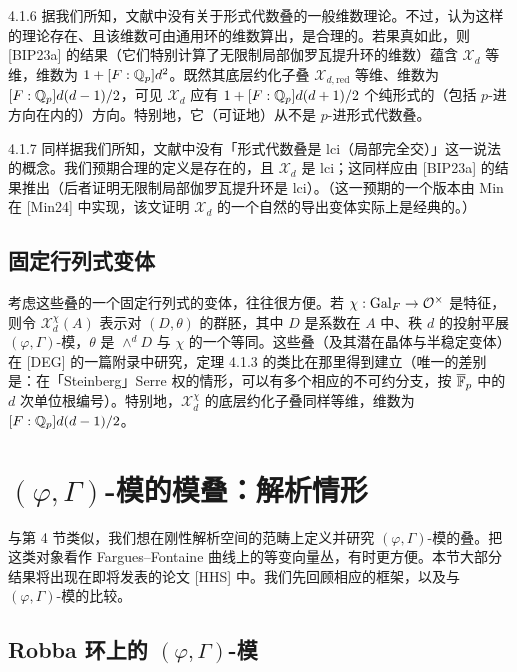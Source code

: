 \begin{rem}{4.1.6}
据我们所知，文献中没有关于形式代数叠的一般维数理论。不过，认为这样的理论存在、且该维数可由通用环的维数算出，是合理的。若果真如此，则 [BIP23a] 的结果（它们特别计算了无限制局部伽罗瓦提升环的维数）蕴含 $\mathcal X_d$ 等维，维数为 $1+[F:\mathbb{Q}_p]d^2$。既然其底层约化子叠 $\mathcal X_{d,\mathrm{red}}$ 等维、维数为 $[F:\mathbb{Q}_p]d(d-1)/2$，可见 $\mathcal X_d$ 应有 $1+[F:\mathbb{Q}_p]d(d+1)/2$ 个纯形式的（包括 $p$-进方向在内的）方向。特别地，它（可证地）从不是 $p$-进形式代数叠。
\end{rem}

\begin{rem}{4.1.7}
同样据我们所知，文献中没有「形式代数叠是 lci（局部完全交）」这一说法的概念。我们预期合理的定义是存在的，且 $\mathcal X_d$ 是 lci；这同样应由 [BIP23a] 的结果推出（后者证明无限制局部伽罗瓦提升环是 lci）。（这一预期的一个版本由 Min 在 [Min24] 中实现，该文证明 $\mathcal X_d$ 的一个自然的导出变体实际上是经典的。）
\end{rem}

\subsection{固定行列式变体}

考虑这些叠的一个固定行列式的变体，往往很方便。若 $\chi:\operatorname{Gal}_F\to\mathcal O^{\times}$ 是特征，则令 $\mathcal X_d^{\chi}(A)$ 表示对 $(D,\theta)$ 的群胚，其中 $D$ 是系数在 $A$ 中、秩 $d$ 的投射平展 $(\varphi,\Gamma)$-模，$\theta$ 是 $\wedge^dD$ 与 $\chi$ 的一个等同。这些叠（及其潜在晶体与半稳定变体）在 [DEG] 的一篇附录中研究，定理 4.1.3 的类比在那里得到建立（唯一的差别是：在「Steinberg」Serre 权的情形，可以有多个相应的不可约分支，按 $\overline{\mathbb{F}}_p$ 中的 $d$ 次单位根编号）。特别地，$\mathcal X_d^{\chi}$ 的底层约化子叠同样等维，维数为 $[F:\mathbb{Q}_p]d(d-1)/2$。

\section{$(\varphi,\Gamma)$-模的模叠：解析情形}

与第 4 节类似，我们想在刚性解析空间的范畴上定义并研究 $(\varphi,\Gamma)$-模的叠。把这类对象看作 Fargues--Fontaine 曲线上的等变向量丛，有时更方便。本节大部分结果将出现在即将发表的论文 [HHS] 中。我们先回顾相应的框架，以及与 $(\varphi,\Gamma)$-模的比较。

\subsection{Robba 环上的 $(\varphi,\Gamma)$-模}

